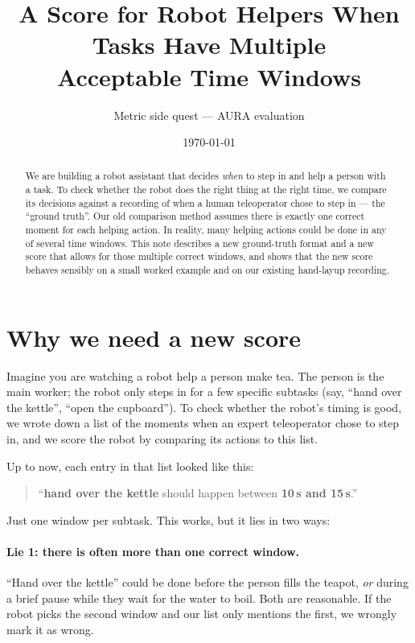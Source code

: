 \documentclass[11pt]{article}
\title{A Score for Robot Helpers When Tasks Have Multiple\\Acceptable Time Windows}
\author{Metric side quest --- AURA evaluation}
\date{\today}
\begin{document}
\maketitle

\begin{abstract}
We are building a robot assistant that decides \emph{when} to step in
and help a person with a task. To check whether the robot does the
right thing at the right time, we compare its decisions against a
recording of when a human teleoperator chose to step in --- the
``ground truth''. Our old comparison method assumes there is exactly
one correct moment for each helping action. In reality, many helping
actions could be done in any of several time windows. This note
describes a new ground-truth format and a new score that allows for
those multiple correct windows, and shows that the new score behaves
sensibly on a small worked example and on our existing hand-layup
recording.
\end{abstract}

\section{Why we need a new score}
\label{sec:motivation}

Imagine you are watching a robot help a person make tea. The person is
the main worker; the robot only steps in for a few specific subtasks
(say, ``hand over the kettle'', ``open the cupboard''). To check
whether the robot's timing is good, we wrote down a list of the
moments when an expert teleoperator chose to step in, and we score the
robot by comparing its actions to this list.

Up to now, each entry in that list looked like this:
\begin{quote}
``\textbf{hand over the kettle} should happen between \textbf{10\,s and
15\,s}.''
\end{quote}
Just one window per subtask. This works, but it lies in two ways:

\paragraph{Lie 1: there is often more than one correct window.}
``Hand over the kettle'' could be done before the person fills the
teapot, \emph{or} during a brief pause while they wait for the water
to boil. Both are reasonable. If the robot picks the second window and
our list only mentions the first, we wrongly mark it as wrong.
\end{document}
